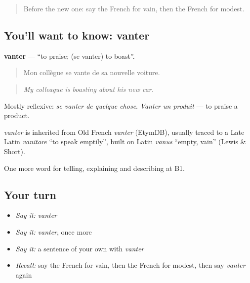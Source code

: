 \label{lesson:FR-C473-vanter}



\begin{quote}
Before the new one: say the French for vain, then the French for modest.
\end{quote}

\subsection*{You'll want to know: vanter}
\textbf{vanter} — \textquotedblleft{}to praise; (se vanter) to boast\textquotedblright{}.

\begin{quote}
Mon collègue se vante de sa nouvelle voiture.
\end{quote}

\begin{quote}
\emph{My colleague is boasting about his new car.}
\end{quote}

Mostly reflexive: \emph{se vanter de quelque chose}. \emph{Vanter un produit} — to praise a product.

\begin{cousinweb}
\emph{vanter} is inherited from Old French \emph{vanter} (EtymDB), usually traced to a Late Latin \emph{vānitāre} \textquotedblleft{}to speak emptily\textquotedblright{}, built on Latin \emph{vānus} \textquotedblleft{}empty, vain\textquotedblright{} (Lewis \& Short).
\end{cousinweb}

\begin{grammarlens}[title={What you've built}]
One more word for telling, explaining and describing at B1.
\end{grammarlens}

\subsection*{Your turn}
\begin{itemize}
\raggedright
  \item \emph{Say it:} \emph{vanter}
  \item \emph{Say it:} \emph{vanter}, once more
  \item \emph{Say it:} a sentence of your own with \emph{vanter}
  \item \emph{Recall:} say the French for vain, then the French for modest, then say \emph{vanter} again
\end{itemize}


